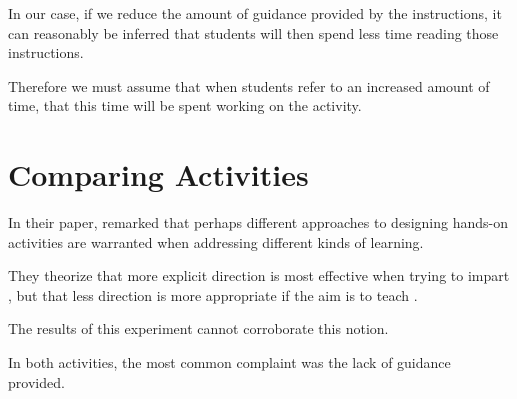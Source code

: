     







    In our case, if we reduce the amount of guidance provided by the instructions, it can reasonably be inferred that students will then spend less time reading those instructions. %







Therefore we must assume that when students refer to an increased amount of time, that this time will be spent working on the activity. 























\section{Comparing Activities}







    In their paper, \citeauthor{R-Weiss} remarked that perhaps different approaches to designing hands-on activities are warranted when addressing different kinds of learning. %







They theorize that more explicit direction is most effective when trying to impart , but that less direction is more appropriate if the aim is to teach . %







The results of this experiment cannot corroborate this notion. %







In both activities, the most common complaint was the lack of guidance provided. 







